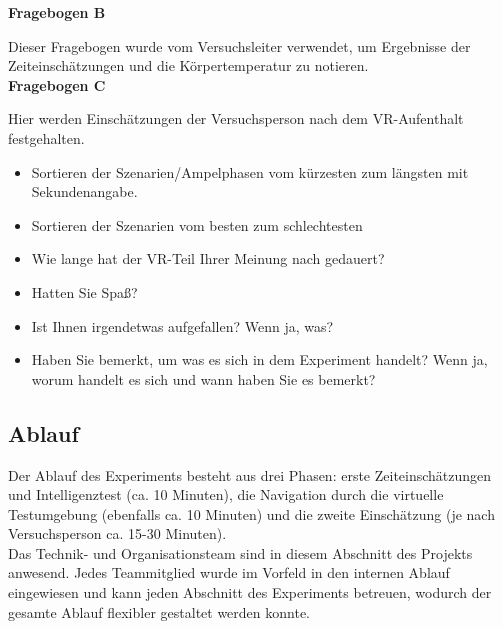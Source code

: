 \documentclass{Bericht}
\begin{document}
\textbf{Fragebogen B}

Dieser Fragebogen wurde vom Versuchsleiter verwendet, um Ergebnisse der Zeiteinschätzungen und die Körpertemperatur zu notieren.\\


\textbf{Fragebogen C}

Hier werden Einschätzungen der Versuchsperson nach dem VR-Aufenthalt festgehalten.

\begin{itemize}
	\setlength{\itemsep}{0em}
	\item Sortieren der Szenarien/Ampelphasen vom kürzesten zum längsten mit Sekundenangabe. 
	\item Sortieren der Szenarien vom besten zum schlechtesten
	\item Wie lange hat der VR-Teil Ihrer Meinung nach gedauert?
	\item Hatten Sie Spaß?
	\item Ist Ihnen irgendetwas aufgefallen? Wenn ja, was?
	\item Haben Sie bemerkt, um was es sich in dem Experiment handelt? Wenn ja, worum handelt es sich und wann haben Sie es bemerkt?
\end{itemize}

\subsection{Ablauf}

Der Ablauf des Experiments besteht aus drei Phasen: erste Zeiteinschätzungen und Intelligenztest (ca. 10 Minuten), die Navigation durch die virtuelle Testumgebung (ebenfalls ca. 10 Minuten) und die zweite Einschätzung (je nach Versuchsperson ca. 15-30 Minuten).\\
Das Technik- und Organisationsteam sind in diesem Abschnitt des Projekts anwesend. Jedes Teammitglied wurde im Vorfeld in den internen Ablauf eingewiesen und kann jeden Abschnitt des Experiments betreuen, wodurch der gesamte Ablauf flexibler gestaltet werden konnte.\\ 
\end{document}
